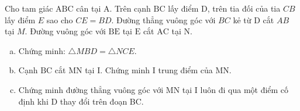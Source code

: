 \begin{bt}
    Cho tam giác $\mathrm{ABC}$ cân tại $\mathrm{A}$. Trên cạnh $\mathrm{BC}$ lấy điểm $\mathrm{D}$, trên tia đối của tia $C B$ lấy điểm $E$ sao cho $C E=B D$. Đường thẳng vuông góc với $B C$ kẻ từ $\mathrm{D}$ cắt $A B$ tại $M$. Đường vuông góc với $\mathrm{BE}$ tại $\mathrm{E}$ cắt $\mathrm{AC}$ tại $\mathrm{N}$.
    \begin{enumerate}[a.]
        \item Chứng minh: $\triangle M B D=\triangle N C E$.
        \item Cạnh $\mathrm{BC}$ cắt $\mathrm{MN}$ tại $\mathrm{I}$. Chứng minh $\mathrm{I}$ trung điểm của $\mathrm{MN}$.
        \item Chứng minh đường thẳng vuông góc với $\mathrm{MN}$ tại $\mathrm{I}$ luôn đi qua một điểm cố định khi D thay đổi trên đoạn BC.
    \end{enumerate}
\end{bt}
